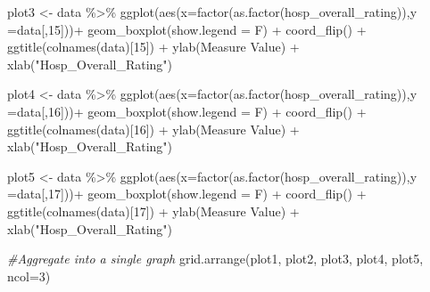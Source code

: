 \documentclass[
]{article}
\newenvironment{Shaded}{\begin{snugshade}}{\end{snugshade}}
\newcommand{\AttributeTok}[1]{\textcolor[rgb]{0.77,0.63,0.00}{#1}}
\newcommand{\CommentTok}[1]{\textcolor[rgb]{0.56,0.35,0.01}{\textit{#1}}}
\newcommand{\DecValTok}[1]{\textcolor[rgb]{0.00,0.00,0.81}{#1}}
\newcommand{\FunctionTok}[1]{\textcolor[rgb]{0.00,0.00,0.00}{#1}}
\newcommand{\NormalTok}[1]{#1}
\newcommand{\OtherTok}[1]{\textcolor[rgb]{0.56,0.35,0.01}{#1}}
\newcommand{\SpecialCharTok}[1]{\textcolor[rgb]{0.00,0.00,0.00}{#1}}
\newcommand{\StringTok}[1]{\textcolor[rgb]{0.31,0.60,0.02}{#1}}
\begin{document}
\begin{Shaded}
\begin{Highlighting}[]
\NormalTok{plot3 }\OtherTok{\textless{}{-}}\NormalTok{ data }\SpecialCharTok{\%\textgreater{}\%} \FunctionTok{ggplot}\NormalTok{(}\FunctionTok{aes}\NormalTok{(}\AttributeTok{x=}\FunctionTok{factor}\NormalTok{(}\FunctionTok{as.factor}\NormalTok{(hosp\_overall\_rating)),}\AttributeTok{y =}\NormalTok{data[,}\DecValTok{15}\NormalTok{]))}\SpecialCharTok{+}
  \FunctionTok{geom\_boxplot}\NormalTok{(}\AttributeTok{show.legend =}\NormalTok{ F) }\SpecialCharTok{+}
  \FunctionTok{coord\_flip}\NormalTok{() }\SpecialCharTok{+}
  \FunctionTok{ggtitle}\NormalTok{(}\FunctionTok{colnames}\NormalTok{(data)[}\DecValTok{15}\NormalTok{]) }\SpecialCharTok{+} 
  \FunctionTok{ylab}\NormalTok{(}\StringTok{\textquotesingle{}Measure Value\textquotesingle{}}\NormalTok{) }\SpecialCharTok{+} \FunctionTok{xlab}\NormalTok{(}\StringTok{"Hosp\_Overall\_Rating"}\NormalTok{)}


\NormalTok{plot4 }\OtherTok{\textless{}{-}}\NormalTok{ data }\SpecialCharTok{\%\textgreater{}\%} \FunctionTok{ggplot}\NormalTok{(}\FunctionTok{aes}\NormalTok{(}\AttributeTok{x=}\FunctionTok{factor}\NormalTok{(}\FunctionTok{as.factor}\NormalTok{(hosp\_overall\_rating)),}\AttributeTok{y =}\NormalTok{data[,}\DecValTok{16}\NormalTok{]))}\SpecialCharTok{+}
  \FunctionTok{geom\_boxplot}\NormalTok{(}\AttributeTok{show.legend =}\NormalTok{ F) }\SpecialCharTok{+}
  \FunctionTok{coord\_flip}\NormalTok{() }\SpecialCharTok{+}
  \FunctionTok{ggtitle}\NormalTok{(}\FunctionTok{colnames}\NormalTok{(data)[}\DecValTok{16}\NormalTok{]) }\SpecialCharTok{+} 
  \FunctionTok{ylab}\NormalTok{(}\StringTok{\textquotesingle{}Measure Value\textquotesingle{}}\NormalTok{) }\SpecialCharTok{+} \FunctionTok{xlab}\NormalTok{(}\StringTok{"Hosp\_Overall\_Rating"}\NormalTok{)}

\NormalTok{plot5 }\OtherTok{\textless{}{-}}\NormalTok{ data }\SpecialCharTok{\%\textgreater{}\%} \FunctionTok{ggplot}\NormalTok{(}\FunctionTok{aes}\NormalTok{(}\AttributeTok{x=}\FunctionTok{factor}\NormalTok{(}\FunctionTok{as.factor}\NormalTok{(hosp\_overall\_rating)),}\AttributeTok{y =}\NormalTok{data[,}\DecValTok{17}\NormalTok{]))}\SpecialCharTok{+}
  \FunctionTok{geom\_boxplot}\NormalTok{(}\AttributeTok{show.legend =}\NormalTok{ F) }\SpecialCharTok{+}
  \FunctionTok{coord\_flip}\NormalTok{() }\SpecialCharTok{+}
  \FunctionTok{ggtitle}\NormalTok{(}\FunctionTok{colnames}\NormalTok{(data)[}\DecValTok{17}\NormalTok{]) }\SpecialCharTok{+} 
  \FunctionTok{ylab}\NormalTok{(}\StringTok{\textquotesingle{}Measure Value\textquotesingle{}}\NormalTok{) }\SpecialCharTok{+} \FunctionTok{xlab}\NormalTok{(}\StringTok{"Hosp\_Overall\_Rating"}\NormalTok{)}

\CommentTok{\#Aggregate into a single graph}
\FunctionTok{grid.arrange}\NormalTok{(plot1, plot2, plot3, plot4, plot5, }\AttributeTok{ncol=}\DecValTok{3}\NormalTok{)}
\end{Highlighting}
\end{Shaded}
\end{document}
